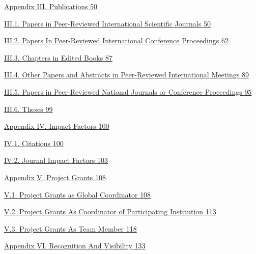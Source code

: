 \documentclass[
]{article}
\begin{document}
\hyperref[publications]{Appendix III. Publications
\hyperref[publications]{50}}

\hyperref[papers-in-peer-reviewed-international-scientific-journals]{III.1.
Papers in Peer-Reviewed International Scientific Journals
\hyperref[papers-in-peer-reviewed-international-scientific-journals]{50}}

\hyperref[papers-in-peer-reviewed-international-conference-proceedings]{III.2.
Papers In Peer-Reviewed International Conference Proceedings
\hyperref[papers-in-peer-reviewed-international-conference-proceedings]{62}}

\hyperref[chapters-in-edited-books]{III.3. Chapters in Edited Books
\hyperref[chapters-in-edited-books]{87}}

\hyperref[other-papers-and-abstracts-in-peer-reviewed-international-meetings]{III.4.
Other Papers and Abstracts in Peer-Reviewed International Meetings
\hyperref[other-papers-and-abstracts-in-peer-reviewed-international-meetings]{89}}

\hyperref[papers-in-peer-reviewed-national-journals-or-conference-proceedings]{III.5.
Papers in Peer-Reviewed National Journals or Conference Proceedings
\hyperref[papers-in-peer-reviewed-national-journals-or-conference-proceedings]{95}}

\hyperref[theses]{III.6. Theses \hyperref[theses]{99}}

\hyperref[impact-factors]{Appendix IV. Impact Factors
\hyperref[impact-factors]{100}}

\hyperref[citations]{IV.1. Citations \hyperref[citations]{100}}

\hyperref[journal-impact-factors]{IV.2. Journal Impact Factors
\hyperref[journal-impact-factors]{103}}

\hyperref[project-grants]{Appendix V. Project Grants
\hyperref[project-grants]{108}}

\hyperref[project-grants-as-global-coordinator]{V.1. Project Grants as
Global Coordinator \hyperref[project-grants-as-global-coordinator]{108}}

\hyperref[project-grants-as-coordinator-of-participating-institution]{V.2.
Project Grants As Coordinator of Participating Institution
\hyperref[project-grants-as-coordinator-of-participating-institution]{113}}

\hyperref[project-grants-as-team-member]{V.3. Project Grants As Team
Member \hyperref[project-grants-as-team-member]{118}}

\hyperref[recognition-and-visibility-1]{Appendix VI. Recognition And
Visibility \hyperref[recognition-and-visibility-1]{133}}
\end{document}
